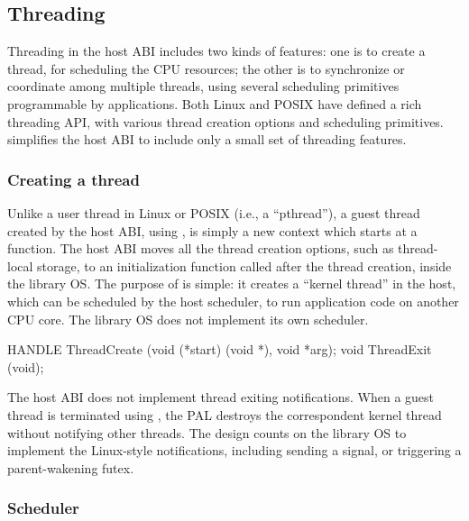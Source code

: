 \subsection{Threading}
\label{sec:abi:thread}

Threading in the host ABI includes two kinds of features:
one is to create a thread, for scheduling the CPU resources; the other is to synchronize or coordinate among multiple threads,
using several scheduling primitives programmable by applications.
Both Linux and POSIX have defined a rich threading API, with various thread creation options
and scheduling primitives.
\graphene{} simplifies the host ABI
to include only a small set of threading features.



\subsubsection*{Creating a thread}



Unlike a user thread in Linux or POSIX (i.e., a ``pthread''),
a guest thread created by the host ABI,
using ,
is simply a new context which starts at a function.
The host ABI
moves all the thread creation options,
such as thread-local storage,
to an initialization function called after the thread creation,
inside the library OS.
The purpose of 
is simple: it creates a ``kernel thread'' in the host,
which can be scheduled by the host scheduler,
to run application code on another CPU core.
The \graphene{} library OS does not implement its own scheduler.


\begin{paldef}
HANDLE ThreadCreate (void (*start) (void *), void *arg);
void ThreadExit (void);
\end{paldef}


The host ABI does not implement thread exiting notifications.
When a guest thread is terminated using , the PAL destroys the correspondent kernel thread
without notifying other threads.
The design counts on the library OS to implement the Linux-style notifications,
including
sending a  signal,
or triggering a parent-wakening futex.




\subsubsection*{Scheduler}




